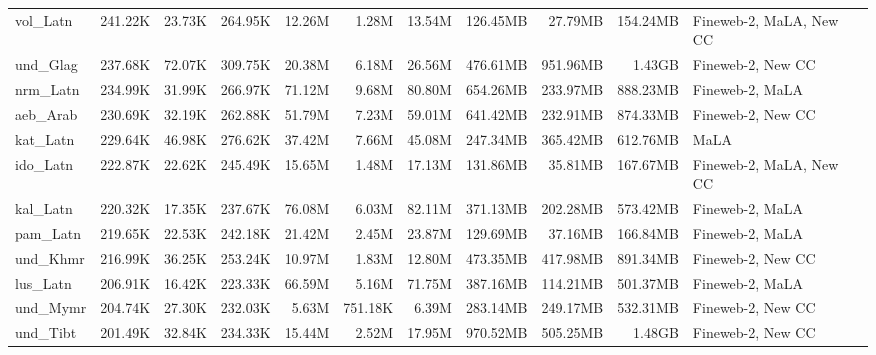\begin{table*}[!htp]
{\begin{tabular}{l|rrr|rrr|rrr|l}
vol\_Latn                   & 241.22K    & 23.73K       & 264.95K     & 12.26M       & 1.28M          & 13.54M        & 126.45MB   & 27.79MB      & 154.24MB    & Fineweb-2, MaLA, New CC \\
und\_Glag                   & 237.68K    & 72.07K       & 309.75K     & 20.38M       & 6.18M          & 26.56M        & 476.61MB   & 951.96MB     & 1.43GB      & Fineweb-2, New CC       \\
nrm\_Latn                   & 234.99K    & 31.99K       & 266.97K     & 71.12M       & 9.68M          & 80.80M        & 654.26MB   & 233.97MB     & 888.23MB    & Fineweb-2, MaLA         \\
aeb\_Arab                   & 230.69K    & 32.19K       & 262.88K     & 51.79M       & 7.23M          & 59.01M        & 641.42MB   & 232.91MB     & 874.33MB    & Fineweb-2, New CC       \\
kat\_Latn                   & 229.64K    & 46.98K       & 276.62K     & 37.42M       & 7.66M          & 45.08M        & 247.34MB   & 365.42MB     & 612.76MB    & MaLA                    \\
ido\_Latn                   & 222.87K    & 22.62K       & 245.49K     & 15.65M       & 1.48M          & 17.13M        & 131.86MB   & 35.81MB      & 167.67MB    & Fineweb-2, MaLA, New CC \\
kal\_Latn                   & 220.32K    & 17.35K       & 237.67K     & 76.08M       & 6.03M          & 82.11M        & 371.13MB   & 202.28MB     & 573.42MB    & Fineweb-2, MaLA         \\
pam\_Latn                   & 219.65K    & 22.53K       & 242.18K     & 21.42M       & 2.45M          & 23.87M        & 129.69MB   & 37.16MB      & 166.84MB    & Fineweb-2, MaLA         \\
und\_Khmr                   & 216.99K    & 36.25K       & 253.24K     & 10.97M       & 1.83M          & 12.80M        & 473.35MB   & 417.98MB     & 891.34MB    & Fineweb-2, New CC       \\
lus\_Latn                   & 206.91K    & 16.42K       & 223.33K     & 66.59M       & 5.16M          & 71.75M        & 387.16MB   & 114.21MB     & 501.37MB    & Fineweb-2, MaLA         \\
und\_Mymr                   & 204.74K    & 27.30K       & 232.03K     & 5.63M        & 751.18K        & 6.39M         & 283.14MB   & 249.17MB     & 532.31MB    & Fineweb-2, New CC       \\
und\_Tibt                   & 201.49K    & 32.84K       & 234.33K     & 15.44M       & 2.52M          & 17.95M        & 970.52MB   & 505.25MB     & 1.48GB      & Fineweb-2, New CC       \\

\end{tabular}}
\end{table*}
